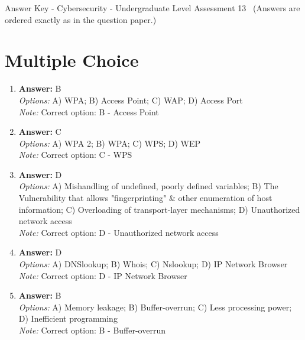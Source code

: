 \documentclass[12pt]{article}
\begin{document}
\begin{center}
Answer Key - Cybersecurity - Undergraduate Level Assessment 13 \
\small (Answers are ordered exactly as in the question paper.)
\end{center}

\section*{Multiple Choice}
\begin{enumerate}[label=\arabic*.]
\item \textbf{Answer:} B
\\ \textit{Options:} A) WPA; B) Access Point; C) WAP; D) Access Port
\\ \textit{Note:} Correct option: B - Access Point
\item \textbf{Answer:} C
\\ \textit{Options:} A) WPA 2; B) WPA; C) WPS; D) WEP
\\ \textit{Note:} Correct option: C - WPS
\item \textbf{Answer:} D
\\ \textit{Options:} A) Mishandling of undefined, poorly defined variables; B) The Vulnerability that allows "fingerprinting" \& other enumeration of host information; C) Overloading of transport-layer mechanisms; D) Unauthorized network access
\\ \textit{Note:} Correct option: D - Unauthorized network access
\item \textbf{Answer:} D
\\ \textit{Options:} A) DNSlookup; B) Whois; C) Nslookup; D) IP Network Browser
\\ \textit{Note:} Correct option: D - IP Network Browser
\item \textbf{Answer:} B
\\ \textit{Options:} A) Memory leakage; B) Buffer-overrun; C) Less processing power; D) Inefficient programming
\\ \textit{Note:} Correct option: B - Buffer-overrun
\end{enumerate}
\end{document}

